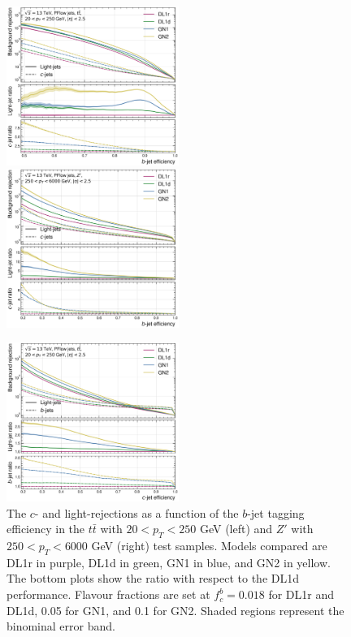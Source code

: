\begin{center}
  \begin{figure}[h!]
  \centerline{
  \includegraphics[width=0.50\textwidth]{Images/FTAG/GN/GN2/rocs/roc_ttbar.png}
  \includegraphics[width=0.50\textwidth]{Images/FTAG/GN/GN2/rocs/roc_zp.png}
  }
  \caption{The $c$- and light-rejections as a function of the $b$-jet tagging efficiency in the $t\bar{t}$ with $20 < p_T < 250$ GeV (left) and $Z'$ with $250 < p_T < 6000$ GeV (right) test samples. Models compared are DL1r in purple, DL1d in green, GN1 in blue, and GN2 in yellow. The bottom plots show the ratio with respect to the DL1d performance. Flavour fractions are set at $f^b_c = 0.018$ for DL1r and DL1d, 0.05 for GN1, and 0.1 for GN2. Shaded regions represent the binominal error band.}
  \label{fig:GN2rocb}
  \bigskip
  \centerline{
  \includegraphics[width=0.50\textwidth]{Images/FTAG/GN/GN2/rocs/roc_ttbar_c.png}
}
\end{figure}
\end{center}
